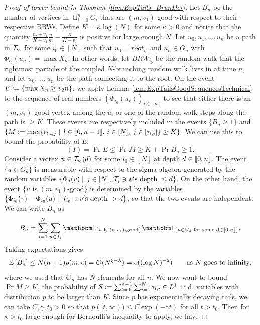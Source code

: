 \begin{proof}[Proof of lower bound in Theorem \ref{thm:ExpTails_BrunDer}]
 Let $B_n$ be the number of vertices in $\sqcup_{i=0}^n G_i$ that are $(m, v_1)$-good with respect to their respective BRWs. Define $K = \kappa \log (N)$ for some $\kappa > 0$ and notice that the quantity $\frac{v_2 - v_1}{K - v_1}\frac{n}{m} - \frac{K}{K - v_1}$ is positive for large enough $N$. Let $u_0, u_1, ..., u_n$ be a path in $\cal{T}_{i_0}$ for some $i_0 \in [N]$ such that $u_0 = root_{i_0}$ and $u_n \in G_n$ with $\Phi_{i_0}(u_n) = \max X_n$. In other words, let $BRW_{i_0}$ be the random walk that the rightmost particle of the coupled $N$-branching random walk lives in at time $n$, and let $u_0, ..., u_n$ be the path connecting it to the root. On the event $E \defeq \{ \max X_n \geq v_2 n \}$, we apply Lemma \ref{lem:ExpTailsGoodSequencesTechnical} to the sequence of real numbers $(\Phi_{i_0}(u_i))_{i \in [n]}$ to see that either there is an $(m, v_1)$-good vertex among the $u_i$ or one of the random walk steps along the path is $ \geq K$. These events are respectively included in the events $\{B_n \geq 1\}$ and $\{M \defeq \max \{\epsilon_{l, i, j} \mid\, l \in \bbracket{0, n - 1},\, i \in [N],\, j \in [\tau_{l, i}] \} \geq K \}$. We can use this to bound the probability of $E$:
\begin{equation}
(I) = \Pr{E} \leq \Pr{M \geq K} + \Pr{B_n \geq 1}. 
\end{equation}
Consider a vertex $u \in \cal{T}_{i_0}(d)$ for some $i_0 \in [N]$ at depth $d \in \bbracket{0, n}$. The event $\{u \in G_d\}$ is measurable with respect to the sigma algebra generated by the random variables $\{ \Phi_j(v) \mid\, j \in [N],\,\cal{T}_j \ni v'\text{s depth }\leq d\}$. On the other hand, the event $\{ u \text{ is }(m, v_1) \text{-good}\}$ is determined by the variables $\{ \Phi_{i_0}(v) - \Phi_{i_0}(u) \mid\, \cal{T}_{i_0} \ni v'\text{s depth }> d\}$, so that the two events are independent. We can write $B_n$ as 
\begin{equation*}
B_n = \sum\limits_{i=1}^N \sum\limits_{u \in \cal{T}_i} \Ind_{\{u \text{ is } (n, v_1)\text{-good}\}} \Ind_{\{u \in G_d \text{ for some d} \in \bbracket{0,n}\}}. 
\end{equation*}
Taking expectations gives 
\begin{equation}\label{eqn:B_nOrder}
\Ex{B_n} \leq N(n+1)\rho(m, \epsilon) = \cal{O}(N^{\xi -\lambda}) = o((\log N)^{-2}) \qquad\text{as $N$ goes to infinity}, 
\end{equation}
where we used that $G_n$ has $N$ elements for all $n$. We now want to bound $\Pr{M \geq K}$, the probability of $S \defeq \sum_{l = 0}^{n-1}\sum_{i=1}^N \tau_{l,i} \in L^1$ i.i.d. variables with distribution $p$ to be larger than $K$. Since $p$ has exponentially decaying tails, we can take $C, \gamma, t_0 > 0$ so that $p([t, \infty)) \leq C \exp(- \gamma t)$ for all $t > t_0$. Then for $\kappa > t_0$ large enough for Bernoulli's inequality to apply, we have

\end{proof}
